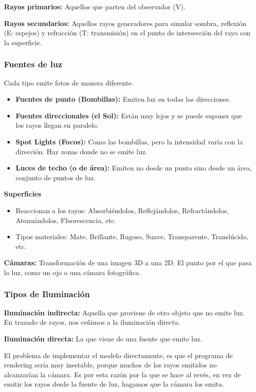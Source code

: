 \textbf{Rayos primarios:} Aquellos que parten del observador (V).

\textbf{Rayos secundarios:} Aquellos rayos generadores para simular sombra, reflexión (E: espejos) y refracción (T: transmisión) en el punto de intersección del rayo con la superficie.

\subsubsection{Fuentes de luz} 
Cada tipo emite fotos de manera diferente.
\begin{itemize}
    \item \textbf{Fuentes de punto (Bombillas):} Emiten luz en todas las direcciones.
    \item \textbf{Fuentes direccionales (el Sol):} Están muy lejos y se puede suponer que los rayos llegan en paralelo.
    \item \textbf{Spot Lights (Focos):} Como las bombillas, pero la intensidad varía con la dirección. Hay zonas donde no se emite luz.
    \item \textbf{Luces de techo (o de área):} Emiten no desde un punto sino desde un área, conjunto de puntos de luz.
\end{itemize}
\pagebreak

\textbf{Superficies}
\begin{itemize}
    \item Reaccionan a los rayos: Absorbiéndolos, Reflejándolos, Refractándolos, Atenuándolos, Fluorescencia, etc.
    \item Tipos materiales: Mate, Brillante, Rugoso, Suave, Transparente, Translúcido, etc.
\end{itemize}

\textbf{Cámaras:} Transformación de una imagen 3D a una 2D. El punto por el que pasa la luz, como un ojo o una cámara fotográfica.

\subsubsection{Tipos de Iluminación}
\textbf{Iluminación indirecta:} Aquella que proviene de otro objeto que no emite luz. En trazado de rayos, nos ceñimos a la iluminación directa.

\textbf{Iluminación directa:} La que viene de una fuente que emite luz.

El problema de implementar el modelo directamente, es que el programa de rendering sería muy inestable, porque muchos de los rayos emitidos no alcanzarían la cámara. Es por esta razón por la que se hace al revés, en vez de emitir los rayos desde la fuente de luz, hagamos que la cámara los emita.

